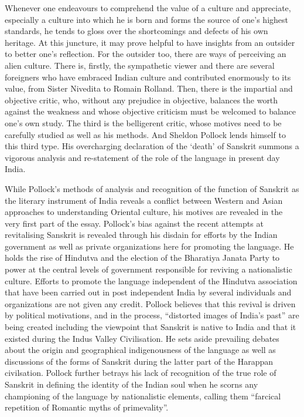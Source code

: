 Whenever one endeavours to comprehend the value of a culture and appreciate, especially a culture into which he is born and forms the source of one’s highest standards, he tends to gloss over the shortcomings and defects of his own heritage. At this juncture, it may prove helpful to have insights from an outsider to better one’s reflection. For the outsider too, there are ways of perceiving an alien culture. There is, firstly, the sympathetic viewer and there are several foreigners who have embraced Indian culture and contributed enormously to its value, from Sister Nivedita to Romain Rolland. Then, there is the impartial and objective critic, who, without any prejudice in objective, balances the worth against the weakness and whose objective criticism must be welcomed to balance one’s own study. The third is the belligerent critic, whose motives need to be carefully studied as well as his methods. And Sheldon Pollock lends himself to this third type. His overcharging declaration of the ‘death’ of Sanskrit summons a vigorous analysis and re-statement of the role of the language in present day India.

While Pollock’s methods of analysis and recognition of the function of Sanskrit as the literary instrument of India reveals a conflict between Western and Asian approaches to understanding Oriental culture, his motives are revealed in the very first part of the essay. Pollock’s bias against the recent attempts at revitalising Sanskrit is revealed through his disdain for efforts by the Indian government as well as private organizations here for promoting the language. He holds the rise of Hindutva and the election of the Bharatiya Janata Party to power at the central levels of government responsible for reviving a nationalistic culture. Efforts to promote the language independent of the Hindutva association that have been carried out in post independent India by several individuals and organizations are not given any credit. Pollock believes that this revival is driven by political motivations, and in the process, “distorted images of India’s past” are being created including the viewpoint that Sanskrit is native to India and that it existed during the Indus Valley Civilisation. He sets aside prevailing debates about the origin and geographical indigenousness of the language as well as discussions of the forms of Sanskrit during the latter part of the Harappan civilsation. Pollock further betrays his lack of recognition of the true role of Sanskrit in defining the identity of the Indian soul when he scorns any championing of the language by nationalistic elements, calling them “farcical repetition of Romantic myths of primevality”. 

